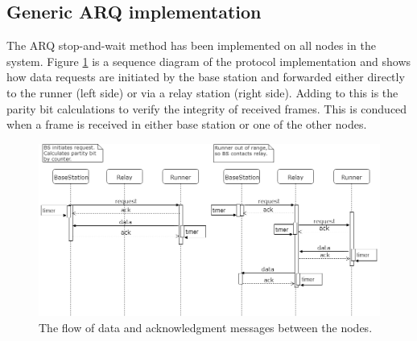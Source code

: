\subsection{Generic ARQ implementation}\label{sc:overall}

The ARQ stop-and-wait method has been implemented on all nodes in the system. Figure \ref{fig:tohopornotarqsequence} is a sequence diagram of the  protocol implementation and shows how data requests are initiated by the base station and forwarded either directly to the runner (left side) or via a relay station (right side). Adding to this is the parity bit calculations to verify the integrity of received frames. This is conduced when a frame is received in either base station or one of the other nodes.

\begin{figure}[h]
	\centering
	\includegraphics[width=1\linewidth]{implementation/overall/toHopOrNotArqSequence}
	\caption{The flow of data and acknowledgment messages between the nodes.}
	\label{fig:tohopornotarqsequence}
\end{figure}

